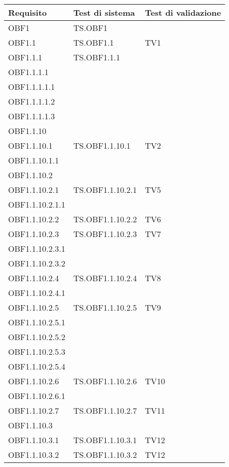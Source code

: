 \documentclass{scalatekids-article}
\begin{document}
\begin{longtable}[H]{|l|p{4cm}|p{4cm}|}
  \hline
  \textbf{Requisito} & \textbf{Test di sistema} & \textbf{Test di validazione}\\
  \hline
  OBF1 & TS.OBF1 &  \\
  \hline
  OBF1.1 & TS.OBF1.1 & TV1 \\
  \hline
  OBF1.1.1 & TS.OBF1.1.1 & \\
  \hline
  OBF1.1.1.1 & & \\
  \hline
  OBF1.1.1.1.1 & & \\
  \hline
  OBF1.1.1.1.2 & & \\
  \hline
  OBF1.1.1.1.3 & & \\
  \hline
  OBF1.1.10 & & \\
  \hline
  OBF1.1.10.1 & TS.OBF1.1.10.1 & TV2 \\
  \hline
  OBF1.1.10.1.1 & & \\
  \hline
  OBF1.1.10.2 &  & \\
  \hline
  OBF1.1.10.2.1 & TS.OBF1.1.10.2.1 & TV5 \\
  \hline
  OBF1.1.10.2.1.1 & & \\
  \hline
  OBF1.1.10.2.2 & TS.OBF1.1.10.2.2 & TV6\\
  \hline
  OBF1.1.10.2.3 & TS.OBF1.1.10.2.3 & TV7\\
  \hline
  OBF1.1.10.2.3.1 & & \\
  \hline
  OBF1.1.10.2.3.2 & & \\
  \hline
  OBF1.1.10.2.4 & TS.OBF1.1.10.2.4 & TV8\\
  \hline
  OBF1.1.10.2.4.1 & & \\
  \hline
  OBF1.1.10.2.5 & TS.OBF1.1.10.2.5 & TV9\\
  \hline
  OBF1.1.10.2.5.1 & & \\
  \hline
  OBF1.1.10.2.5.2 & & \\
  \hline
  OBF1.1.10.2.5.3 & & \\
  \hline
  OBF1.1.10.2.5.4 & & \\
  \hline
  OBF1.1.10.2.6 & TS.OBF1.1.10.2.6 & TV10\\
  \hline
  OBF1.1.10.2.6.1 & & \\
  \hline
  OBF1.1.10.2.7 & TS.OBF1.1.10.2.7 & TV11\\
  \hline
  OBF1.1.10.3 & & \\
  \hline
  OBF1.1.10.3.1 & TS.OBF1.1.10.3.1 & TV12\\
  \hline
  OBF1.1.10.3.2 & TS.OBF1.1.10.3.2 & TV12\\
  \hline

\end{longtable}
\end{document}
